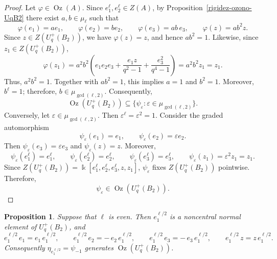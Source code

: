 \documentclass[11pt]{article}
\newtheorem{proposition}[theorem]{Proposition}
\theoremstyle{definition}
\newcommand{\K}{\Bbbk}
\begin{document}
\begin{proof}
Let \(\varphi\in\operatorname{Oz}(A)\). Since
\(e_1^\ell,e_2^\ell\in Z(A)\), by Proposition~\ref{rigidez-ozono-UqB2}
there exist \(a,b\in\mu_\ell\) such that
$$
\varphi(e_1)=ae_1,\qquad
\varphi(e_2)=be_2,\qquad
\varphi(e_3)=ab\,e_3,\qquad
\varphi(z)=ab^2z.
$$
Since \(z\in Z(U_q^{+}(B_2))\), we have \(\varphi(z)=z\), and hence
\(ab^2=1\). Likewise, since \(z_1\in Z(U_q^{+}(B_2))\),
$$
\varphi(z_1)
=a^2b^2\left(e_1e_2e_3+\frac{e_1z}{q^2-1}+\frac{e_3^2}{q^4-1}\right)
=a^2b^2z_1=z_1.
$$
Thus, \(a^2b^2=1\). Together with \(ab^2=1\), this implies \(a=1\) and
\(b^2=1\). Moreover, \(b^\ell=1\); therefore,
\(b\in\mu_{\gcd(\ell,2)}\). Consequently,
$$
\operatorname{Oz}(U_q^{+}(B_2))\subseteq
\{\psi_\varepsilon:\varepsilon\in\mu_{\gcd(\ell,2)}\}.
$$
Conversely, let \(\varepsilon\in\mu_{\gcd(\ell,2)}\). Then
\(\varepsilon^\ell=\varepsilon^2=1\). Consider the graded automorphism
$$
\psi_\varepsilon(e_1)=e_1,\qquad
\psi_\varepsilon(e_2)=\varepsilon e_2.
$$
Then \(\psi_\varepsilon(e_3)=\varepsilon e_3\) and
\(\psi_\varepsilon(z)=z\). Moreover,
$$
\psi_\varepsilon(e_1^\ell)=e_1^\ell,\qquad
\psi_\varepsilon(e_2^\ell)=e_2^\ell,\qquad
\psi_\varepsilon(e_3^\ell)=e_3^\ell,\qquad
\psi_\varepsilon(z_1)=\varepsilon^2z_1=z_1.
$$
Since
\(Z(U_q^{+}(B_2))=\K[e_1^\ell,e_2^\ell,e_3^\ell,z,z_1]\),
\(\psi_\varepsilon\) fixes \(Z(U_q^{+}(B_2))\) pointwise. Therefore,
$$
\psi_\varepsilon\in\operatorname{Oz}(U_q^{+}(B_2)).
$$
\end{proof}


\begin{proposition}\label{prop:normal-explicito}
Suppose that \(\ell\) is even. Then \(e_1^{\ell/2}\) is a noncentral normal
element of \(U_q^{+}(B_2)\), and
\[
e_1^{\ell/2}\,e_1=e_1\,e_1^{\ell/2},\qquad
e_1^{\ell/2}\,e_2=-\,e_2\,e_1^{\ell/2},\qquad
e_1^{\ell/2}\,e_3=-\,e_3\,e_1^{\ell/2},\qquad
e_1^{\ell/2}\,z=z\,e_1^{\ell/2}.
\]
Consequently \(\eta_{e_1^{\ell/2}}=\psi_{-1}\) generates
\(\operatorname{Oz}(U_q^{+}(B_2))\).
\end{proposition}
\end{document}
